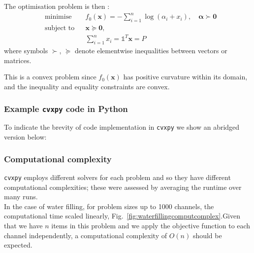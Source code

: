 \documentclass[twocolumn,secnumarabic,amssymb, nobibnotes, aps, prl,superscriptaddress]{revtex4-1}
\begin{document}

The optimisation problem is then \cite{cvxpybook}:
\begin{align}
& \text{minimise} 
& & f_{0}(\textbf{x})=-\sum^{n}_{i=1}\log(\alpha_{i}+x_{i}),\quad\boldsymbol{\alpha} \succ \textbf{0}\nonumber\\
& \text{subject to} 
&& \textbf{x} \succeq \textbf{0} , \nonumber\\& && \sum^{n}_{i=1}x_{i}=\mathds{1}^{T}\textbf{x}=P
\end{align}
where symbols $\succ$, $\succeq$ denote elementwise inequalities between vectors or matrices. 

This is a convex problem since $f_0(\textbf{x})$ has positive curvature within its domain, and the inequality and equality constraints are convex. 

\subsubsection{Example \texttt{cvxpy} code in Python}
To indicate the brevity of code implementation in \texttt{cvxpy} we show an abridged version below:


\subsubsection{Computational complexity}
\texttt{cvxpy} employs different solvers for each problem and so they have different computational complexities; these were assessed by averaging the runtime over many runs.\\ 
In the case of water filling, for problem sizes up to 1000 channels, the computational time scaled linearly, Fig.~\ref{fig:waterfillingcomputcomplex}.Given that we have $n$ items in this problem and we apply the objective function to each channel independently, a computational complexity of $O(n)$ should be expected.
\end{document}
